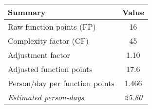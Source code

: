 \begin{tabular}{l|c}
\textbf{Summary} & \textbf{Value} \\ \hline
Raw function points (FP) & 16 \\
Complexity factor (CF) & 45 \\
Adjustment factor & 1.10 \\
Adjusted function points & 17.6 \\
Person/day per function points & 1.466 \\ \hline
\textit{Estimated person-days} & \textit{25.80}
\end{tabular}
